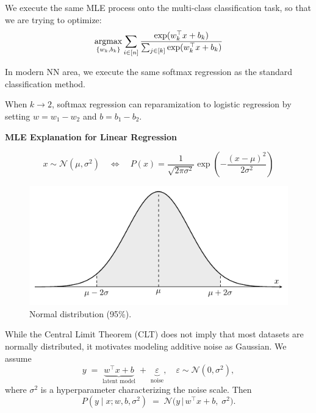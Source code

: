 \documentclass[../main]{subfiles}
\begin{document}
We execute the same MLE process onto the multi-class classification task, so that we are trying to optimize:
\begin{equation}
    \mathop{\mathrm{argmax}}_{\{w_k,b_k\}}\sum_{i\in[n]}\frac{\exp(w^\top_kx+b_k)}{\sum_{j\in[k]}\exp(w^\top_kx+b_k)}
\end{equation}
\begin{note}
  In modern NN area, we execute the same softmax regression as the standard classification method.
\end{note}
\begin{remark}
  When $k\to 2$, softmax regression can reparamization to logistic regression by setting $w=w_1-w_2$ and $b=b_1-b_2$.
\end{remark}
\begin{example}
  \textbf{MLE Explanation for Linear Regression}
\end{example}
\begin{definition}
    \begin{equation}
        x\sim\mathcal N(\mu,\sigma^2)\quad\Leftrightarrow\quad P(x)=\frac{1}{\sqrt{2\pi\sigma^2}}\exp\left(-\frac{(x-\mu)^2}{2\sigma^2}\right)
    \end{equation}
\end{definition}
\begin{figure}[H]
  \centering
  \includegraphics{../../tikz/2/3.pdf}
  \caption{Normal distribution (95\%).}
  \label{2-lr}
\end{figure}
While the Central Limit Theorem (CLT) does not imply that most datasets are normally distributed, 
it motivates modeling additive noise as Gaussian. We assume
\begin{equation}
  y \;=\;
  \underbrace{w^\top x + b}_{\text{latent model}}
  \;+\;
  \underbrace{\varepsilon}_{\text{noise}}, 
  \quad \varepsilon \sim \mathcal N(0,\sigma^2),
\end{equation}
where $\sigma^2$ is a hyperparameter characterizing the noise scale. Then
\begin{equation}
  P(y \mid x; w,b,\sigma^2) \;=\; \mathcal N\!\big(y \,\big|\, w^\top x + b,\; \sigma^2\big).
\end{equation}
\end{document}
